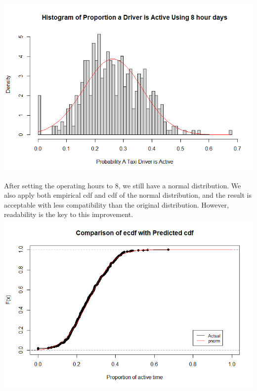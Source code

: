 \documentclass[11pt]{article}
\begin{document}
\noindent\includegraphics[scale = .70]{8_hour_busy_time.png}\\
\par
After setting the operating hours to 8, we still have a normal distribution. We also apply both empirical cdf and cdf of the normal distribution,
and the result is acceptable with less compatibility than the original distribution. However, readability is the key to this improvement.\\

\noindent\includegraphics[scale = .70]{8_hour_busy_time_cdf.png}\\
\end{document}
